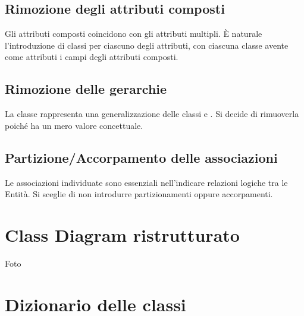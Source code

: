 \subsection{Rimozione degli attributi composti}
Gli attributi composti coincidono con gli attributi multipli. È naturale l'introduzione di classi per ciascuno degli attributi, con ciascuna classe avente come attributi i campi degli attributi composti. 
\subsection{Rimozione delle gerarchie}
La classe \Elemento rappresenta una generalizzazione delle classi \Contatto e \Gruppo. Si decide di rimuoverla poiché ha un mero valore concettuale.
\subsection{Partizione/Accorpamento delle associazioni}
Le associazioni individuate sono essenziali nell'indicare relazioni logiche tra le Entità. Si sceglie di non introdurre partizionamenti oppure accorpamenti.
\section{Class Diagram ristrutturato}
{\Huge Foto}
\clearpage        
\section{Dizionario delle classi}

